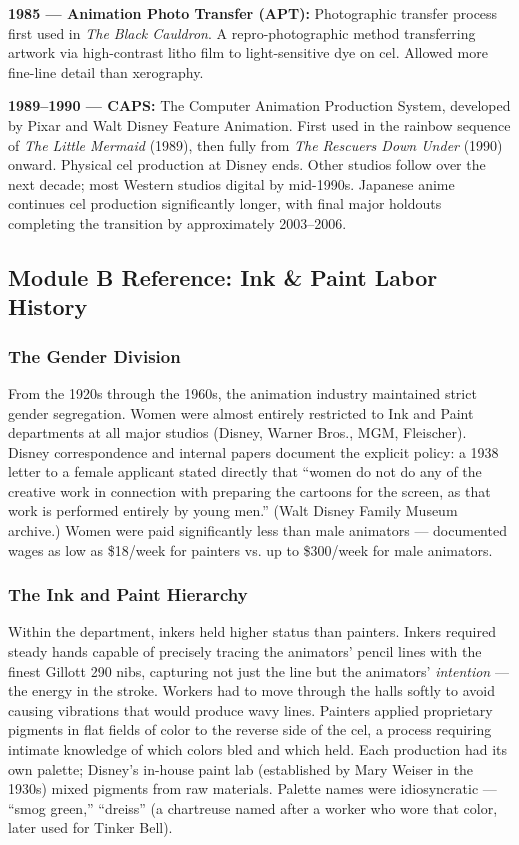 \documentclass[11pt,letterpaper]{article}
\begin{document}
\textbf{1985 --- Animation Photo Transfer (APT):} Photographic transfer process first used in \textit{The Black Cauldron}. A repro-photographic method transferring artwork via high-contrast litho film to light-sensitive dye on cel. Allowed more fine-line detail than xerography.

\textbf{1989--1990 --- CAPS:} The Computer Animation Production System, developed by Pixar and Walt Disney Feature Animation. First used in the rainbow sequence of \textit{The Little Mermaid} (1989), then fully from \textit{The Rescuers Down Under} (1990) onward. Physical cel production at Disney ends. Other studios follow over the next decade; most Western studios digital by mid-1990s. Japanese anime continues cel production significantly longer, with final major holdouts completing the transition by approximately 2003--2006.

\subsection{Module B Reference: Ink \& Paint Labor History}

\subsubsection{The Gender Division}

From the 1920s through the 1960s, the animation industry maintained strict gender segregation. Women were almost entirely restricted to Ink and Paint departments at all major studios (Disney, Warner Bros., MGM, Fleischer). Disney correspondence and internal papers document the explicit policy: a 1938 letter to a female applicant stated directly that ``women do not do any of the creative work in connection with preparing the cartoons for the screen, as that work is performed entirely by young men.'' (Walt Disney Family Museum archive.) Women were paid significantly less than male animators --- documented wages as low as \$18/week for painters vs. up to \$300/week for male animators.

\subsubsection{The Ink and Paint Hierarchy}

Within the department, inkers held higher status than painters. Inkers required steady hands capable of precisely tracing the animators' pencil lines with the finest Gillott 290 nibs, capturing not just the line but the animators' \textit{intention} --- the energy in the stroke. Workers had to move through the halls softly to avoid causing vibrations that would produce wavy lines. Painters applied proprietary pigments in flat fields of color to the reverse side of the cel, a process requiring intimate knowledge of which colors bled and which held. Each production had its own palette; Disney's in-house paint lab (established by Mary Weiser in the 1930s) mixed pigments from raw materials. Palette names were idiosyncratic --- ``smog green,'' ``dreiss'' (a chartreuse named after a worker who wore that color, later used for Tinker Bell).
\end{document}
